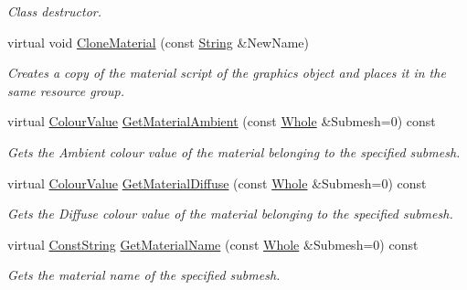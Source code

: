 \begin{DoxyCompactItemize}
\begin{DoxyCompactList}\small\item\em Class destructor. \item\end{DoxyCompactList}\item 
virtual void \hyperlink{classMezzanine_1_1WorldObjectGraphicsSettings_a36002a588b5a0a7494d29f8e7a7a30b1}{CloneMaterial} (const \hyperlink{namespaceMezzanine_acf9fcc130e6ebf08e3d8491aebcf1c86}{String} \&NewName)
\begin{DoxyCompactList}\small\item\em Creates a copy of the material script of the graphics object and places it in the same resource group. \item\end{DoxyCompactList}\item 
virtual \hyperlink{classMezzanine_1_1ColourValue}{ColourValue} \hyperlink{classMezzanine_1_1WorldObjectGraphicsSettings_a7cc74921d09f867ef90f24dea9f86e69}{GetMaterialAmbient} (const \hyperlink{namespaceMezzanine_adcbb6ce6d1eb4379d109e51171e2e493}{Whole} \&Submesh=0) const 
\begin{DoxyCompactList}\small\item\em Gets the Ambient colour value of the material belonging to the specified submesh. \item\end{DoxyCompactList}\item 
virtual \hyperlink{classMezzanine_1_1ColourValue}{ColourValue} \hyperlink{classMezzanine_1_1WorldObjectGraphicsSettings_af8299a94bfc54dc8f1d2f39fd6b485a6}{GetMaterialDiffuse} (const \hyperlink{namespaceMezzanine_adcbb6ce6d1eb4379d109e51171e2e493}{Whole} \&Submesh=0) const 
\begin{DoxyCompactList}\small\item\em Gets the Diffuse colour value of the material belonging to the specified submesh. \item\end{DoxyCompactList}\item 
virtual \hyperlink{namespaceMezzanine_a63cd699ac54b73953f35ec9cfc05e506}{ConstString} \hyperlink{classMezzanine_1_1WorldObjectGraphicsSettings_ac97ab17ac30eb95eac06de39e5e89f2a}{GetMaterialName} (const \hyperlink{namespaceMezzanine_adcbb6ce6d1eb4379d109e51171e2e493}{Whole} \&Submesh=0) const 
\begin{DoxyCompactList}\small\item\em Gets the material name of the specified submesh. \item\end{DoxyCompactList}\item 

\end{DoxyCompactItemize}
